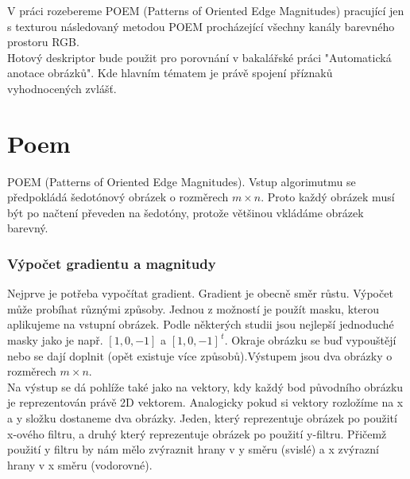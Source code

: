 \documentclass{report}
\begin{document}
V práci rozebereme POEM (Patterns of Oriented Edge Magnitudes) pracující jen s texturou následovaný metodou POEM procházející všechny kanály barevného prostoru RGB. \\

Hotový deskriptor bude použit pro porovnání v bakalářské práci "Automatická anotace obrázků". Kde hlavním tématem je právě spojení příznaků vyhodnocených zvlášť. 

\chapter{Poem}
POEM (Patterns of Oriented Edge Magnitudes). Vstup algorimutmu se předpokládá šedotónový obrázek o rozměrech  $m \times n$. Proto každý obrázek musí být po načtení převeden na šedotóny, protože většinou vkládáme obrázek barevný. \cite{SrovnaniDeskriptoru}

\subsection{Výpočet gradientu a magnitudy}
Nejprve je potřeba vypočítat gradient. Gradient je obecně směr růstu. Výpočet může probíhat různými způsoby. Jednou z možností je použít masku, kterou aplikujeme na vstupní obrázek. Podle některých studii jsou nejlepší jednoduché masky jako je např. $[1, 0, -1]$ a $[1, 0, -1]^{\,t}$. Okraje obrázku se buď vypouštějí nebo se dají doplnit (opět existuje více způsobů).Výstupem jsou dva obrázky o rozměrech $m \times n$. \\
Na výstup se dá pohlíže také jako na vektory, kdy každý bod původního obrázku je reprezentován právě 2D vektorem. Analogicky pokud si vektory rozložíme na x a y složku dostaneme dva obrázky. Jeden, který reprezentuje obrázek po použití x-ového filtru, a druhý který reprezentuje obrázek po použití y-filtru. Přičemž použití y filtru by nám mělo zvýraznit hrany v y směru (svislé) a x zvýrazní hrany v x směru (vodorovné). \\
\end{document}
